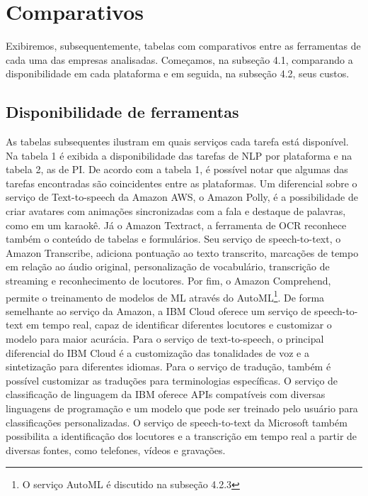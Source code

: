 \documentclass{article}
\begin{document}
\section{Comparativos}

Exibiremos, subsequentemente, tabelas com comparativos entre as ferramentas de cada uma das empresas analisadas. Começamos, na subseção 4.1, comparando a disponibilidade em cada plataforma e em seguida, na subseção 4.2, seus custos.

\subsection{Disponibilidade de ferramentas}
 As tabelas subsequentes ilustram em quais serviços cada tarefa está disponível. Na tabela 1 é exibida a disponibilidade das tarefas de NLP por plataforma e na tabela 2, as de PI. De acordo com a tabela 1, é possível notar que algumas das tarefas encontradas são coincidentes entre as plataformas. Um diferencial sobre o serviço de Text-to-speech da Amazon AWS, o Amazon Polly, é a possibilidade de criar avatares com animações sincronizadas com a fala e destaque de palavras, como em um karaokê. Já o Amazon Textract, a ferramenta de OCR reconhece também o conteúdo de tabelas e formulários. Seu serviço de speech-to-text, o Amazon Transcribe, adiciona pontuação ao texto transcrito, marcações de tempo em relação ao áudio original, personalização de vocabulário, transcrição de streaming e reconhecimento de locutores. Por fim, o Amazon Comprehend, permite o treinamento de modelos de ML através do AutoML\footnote{O serviço AutoML é discutido na subseção 4.2.3}. De forma semelhante ao serviço da Amazon, a IBM Cloud oferece um serviço de speech-to-text em tempo real, capaz de identificar diferentes locutores e customizar o modelo para maior acurácia. Para o serviço de text-to-speech, o principal diferencial do IBM Cloud é a customização das tonalidades de voz e a sintetização para diferentes idiomas. Para o serviço de tradução, também é possível customizar as traduções para terminologias específicas. O serviço de classificação de linguagem da IBM oferece APIs compatíveis com diversas linguagens de programação e um modelo que pode ser treinado pelo usuário para classificações personalizadas. O serviço de speech-to-text da Microsoft também possibilita a identificação dos locutores e a transcrição em tempo real a partir de diversas fontes, como telefones, vídeos e gravações.
\end{document}
